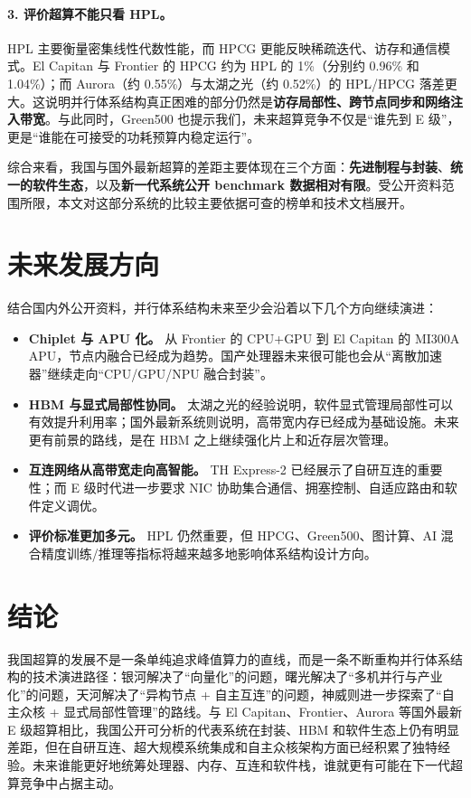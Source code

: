 \documentclass[a4paper]{article}
\begin{document}
\paragraph{3. 评价超算不能只看 HPL。}
HPL 主要衡量密集线性代数性能，而 HPCG 更能反映稀疏迭代、访存和通信模式。El Capitan 与 Frontier 的 HPCG 约为 HPL 的 1\%（分别约 0.96\% 和 1.04\%）；而 Aurora（约 0.55\%）与太湖之光（约 0.52\%）的 HPL/HPCG 落差更大\cite{hpcg_2025_11,hpcg_2017_11}。这说明并行体系结构真正困难的部分仍然是\textbf{访存局部性、跨节点同步和网络注入带宽}。与此同时，Green500 也提示我们，未来超算竞争不仅是“谁先到 E 级”，更是“谁能在可接受的功耗预算内稳定运行”。

综合来看，我国与国外最新超算的差距主要体现在三个方面：\textbf{先进制程与封装}、\textbf{统一的软件生态}，以及\textbf{新一代系统公开 benchmark 数据相对有限}。受公开资料范围所限，本文对这部分系统的比较主要依据可查的榜单和技术文档展开。

\section{未来发展方向}
结合国内外公开资料，并行体系结构未来至少会沿着以下几个方向继续演进：

\begin{itemize}
  \item \textbf{Chiplet 与 APU 化。} 从 Frontier 的 CPU+GPU 到 El Capitan 的 MI300A APU，节点内融合已经成为趋势。国产处理器未来很可能也会从“离散加速器”继续走向“CPU/GPU/NPU 融合封装”。
  \item \textbf{HBM 与显式局部性协同。} 太湖之光的经验说明，软件显式管理局部性可以有效提升利用率；国外最新系统则说明，高带宽内存已经成为基础设施。未来更有前景的路线，是在 HBM 之上继续强化片上和近存层次管理。
  \item \textbf{互连网络从高带宽走向高智能。} TH Express-2 已经展示了自研互连的重要性；而 E 级时代进一步要求 NIC 协助集合通信、拥塞控制、自适应路由和软件定义调优。
  \item \textbf{评价标准更加多元。} HPL 仍然重要，但 HPCG、Green500、图计算、AI 混合精度训练/推理等指标将越来越多地影响体系结构设计方向。
\end{itemize}

\section{结论}
我国超算的发展不是一条单纯追求峰值算力的直线，而是一条不断重构并行体系结构的技术演进路径：银河解决了“向量化”的问题，曙光解决了“多机并行与产业化”的问题，天河解决了“异构节点 + 自主互连”的问题，神威则进一步探索了“自主众核 + 显式局部性管理”的路线。与 El Capitan、Frontier、Aurora 等国外最新 E 级超算相比，我国公开可分析的代表系统在封装、HBM 和软件生态上仍有明显差距，但在自研互连、超大规模系统集成和自主众核架构方面已经积累了独特经验。未来谁能更好地统筹处理器、内存、互连和软件栈，谁就更有可能在下一代超算竞争中占据主动。

\renewcommand{\refname}{参考文献}


\end{document}
